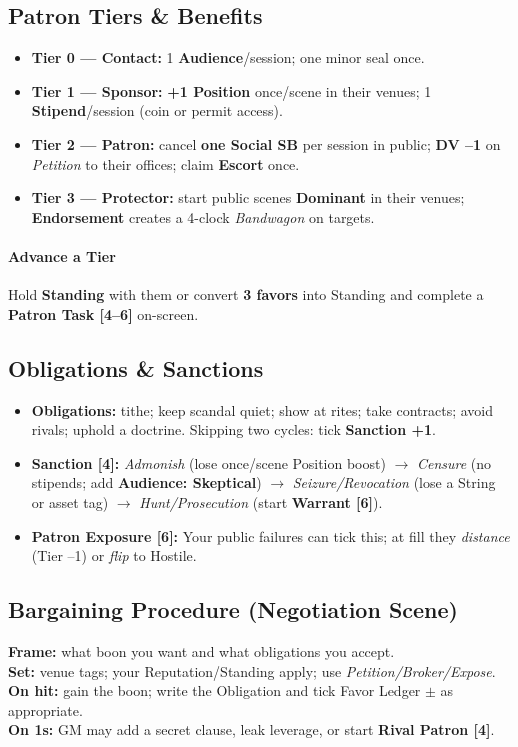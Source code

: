 \documentclass[11pt]{article}
\begin{document}
\subsection{Patron Tiers \& Benefits}
\begin{itemize}
  \item \textbf{Tier 0 --- Contact:} 1 \textbf{Audience}/session; one minor seal once.
  \item \textbf{Tier 1 --- Sponsor:} \textbf{+1 Position} once/scene in their venues; 1 \textbf{Stipend}/session (coin or permit access).
  \item \textbf{Tier 2 --- Patron:} cancel \textbf{one Social SB} per session in public; \textbf{DV --1} on \emph{Petition} to their offices; claim \textbf{Escort} once.
  \item \textbf{Tier 3 --- Protector:} start public scenes \textbf{Dominant} in their venues; \textbf{Endorsement} creates a 4-clock \emph{Bandwagon} on targets.
\end{itemize}
\paragraph{Advance a Tier} Hold \textbf{Standing} with them or convert \textbf{3 favors} into Standing and complete a \textbf{Patron Task [4--6]} on-screen.

\subsection{Obligations \& Sanctions}
\begin{itemize}
  \item \textbf{Obligations:} tithe; keep scandal quiet; show at rites; take contracts; avoid rivals; uphold a doctrine. Skipping two cycles: tick \textbf{Sanction +1}.
  \item \textbf{Sanction [4]:} \emph{Admonish} (lose once/scene Position boost) $\to$ \emph{Censure} (no stipends; add \textbf{Audience: Skeptical}) $\to$ \emph{Seizure/Revocation} (lose a String or asset tag) $\to$ \emph{Hunt/Prosecution} (start \textbf{Warrant [6]}).
  \item \textbf{Patron Exposure [6]:} Your public failures can tick this; at fill they \emph{distance} (Tier --1) or \emph{flip} to Hostile.
\end{itemize}

\subsection{Bargaining Procedure (Negotiation Scene)}
\textbf{Frame:} what boon you want and what obligations you accept.\\
\textbf{Set:} venue tags; your Reputation/Standing apply; use \emph{Petition/Broker/Expose}.\\
\textbf{On hit:} gain the boon; write the Obligation and tick Favor Ledger $\pm$ as appropriate.\\
\textbf{On 1s:} GM may add a secret clause, leak leverage, or start \textbf{Rival Patron [4]}.
\end{document}
